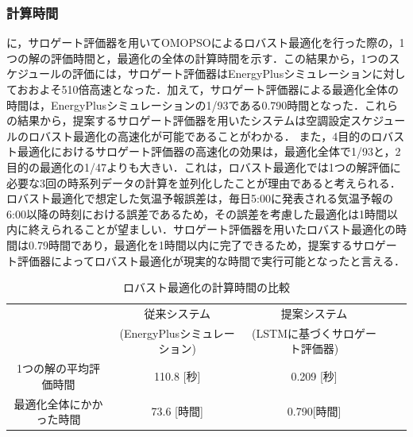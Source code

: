 \subsubsection{計算時間}
に，サロゲート評価器を用いてOMOPSOによるロバスト最適化を行った際の，1つの解の評価時間と，最適化の全体の計算時間を示す．この結果から，1つのスケジュールの評価には，サロゲート評価器はEnergyPlusシミュレーションに対しておおよそ510倍高速となった．加えて，サロゲート評価器による最適化全体の時間は，EnergyPlusシミュレーションの1/93である0.790時間となった．これらの結果から，提案するサロゲート評価器を用いたシステムは空調設定スケジュールのロバスト最適化の高速化が可能であることがわかる．
また，4目的のロバスト最適化におけるサロゲート評価器の高速化の効果は，最適化全体で1/93と，2目的の最適化の1/47よりも大きい．これは，ロバスト最適化では1つの解評価に必要な3回の時系列データの計算を並列化したことが理由であると考えられる．
ロバスト最適化で想定した気温予報誤差は，毎日5:00に発表される気温予報の6:00以降の時刻における誤差であるため，その誤差を考慮した最適化は1時間以内に終えられることが望ましい．サロゲート評価器を用いたロバスト最適化の時間は0.79時間であり，最適化を1時間以内に完了できるため，提案するサロゲート評価器によってロバスト最適化が現実的な時間で実行可能となったと言える．

\begin{table}[t]
  {\footnotesize
    \begin{center}
      \caption{ロバスト最適化の計算時間の比較}
      \label{tab::surrogate_result_time_robust}
      \begin{tabular}{c|cccc}
        \hline
                                 & 従来システム                 & 提案システム                   \\
                                 & (EnergyPlusシミュレーション) & (LSTMに基づくサロゲート評価器) \\
        \hline \hline
        1つの解の平均評価時間    & 110.8 [秒]                   & 0.209 [秒]                     \\
        最適化全体にかかった時間 & 73.6 [時間]                  & 0.790[時間]                    \\
        \hline
      \end{tabular}
    \end{center}
  }
\end{table}

